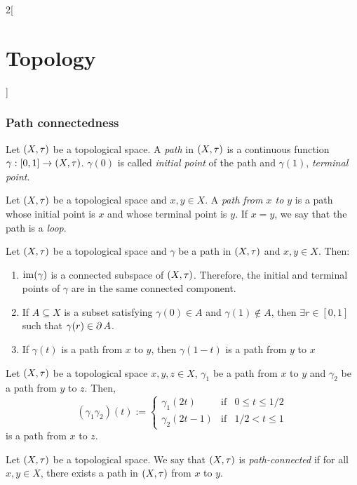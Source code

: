 \documentclass[../../../main.tex]{subfiles}
\begin{document}
\begin{multicols}{2}[\section{Topology}]
  \subsubsection{Path connectedness}
  \begin{definition}
    Let $(X,\tau)$ be a topological space. A \emph{path} in $(X,\tau)$ is a continuous function $\gamma:[0,1]\rightarrow (X,\tau)$. $\gamma(0)$ is called \emph{initial point} of the path and $\gamma(1)$, \emph{terminal point}.
  \end{definition}
  \begin{definition}
    Let $(X,\tau)$ be a topological space and $x,y\in X$. A \emph{path from $x$ to $y$} is a path whose initial point is $x$ and whose terminal point is $y$. If $x=y$, we say that the path is a \emph{loop}.
  \end{definition}
  \begin{prop}
    Let $(X,\tau)$ be a topological space and $\gamma$ be a path in $(X,\tau)$ and $x,y\in X$. Then:
    \begin{enumerate}
      \item $\operatorname{im}(\gamma)$ is a connected subspace of $(X,\tau)$. Therefore, the initial and terminal points of $\gamma$ are in the same connected component.
      \item If $A\subseteq X$ is a subset satisfying $\gamma(0)\in A$ and $\gamma(1)\notin A$, then $\exists r\in[0,1]$ such that $\gamma(r)\in\operatorname{\partial} A$.
      \item If $\gamma(t)$ is a path from $x$ to $y$, then  $\gamma(1-t)$ is a path from $y$ to $x$
    \end{enumerate}
  \end{prop}
  \begin{prop}
    Let $(X,\tau)$ be a topological space $x,y,z\in X$, $\gamma_1$ be a path from $x$ to $y$ and $\gamma_2$ be a path from $y$ to $z$. Then, $$(\gamma_1\gamma_2)(t):=\left\{
      \begin{array}{lcc}
        \gamma_1(2t)   & \text{if} & 0\leq t\leq 1/2 \\
        \gamma_2(2t-1) & \text{if} & 1/2 <t\leq 1
      \end{array}
      \right.$$
    is a path from $x$ to $z$.
  \end{prop}
  \begin{definition}
    Let $(X,\tau)$ be a topological space. We say that $(X,\tau)$ is \emph{path-connected} if for all $x,y\in X$, there exists a path in $(X,\tau)$ from $x$ to $y$.
  \end{definition}

\end{multicols}
\end{document}

